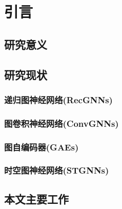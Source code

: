 \cleardoublepage

\section{引言}

\subsection{研究意义}

\subsection{研究现状}
\subsubsection{递归图神经网络(RecGNNs)}
\subsubsection{图卷积神经网络(ConvGNNs)}
\subsubsection{图自编码器(GAEs)}
\subsubsection{时空图神经网络(STGNNs)}

\subsection{本文主要工作}


